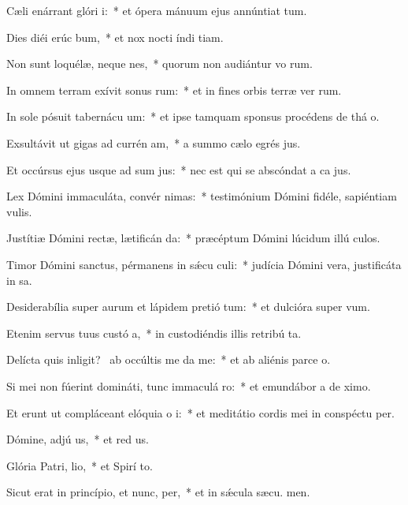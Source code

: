 \item Cæli enárrant glóri i:~* et ópera mánuum ejus annúntiat tum.
\item Dies diéi erúc bum,~* et nox nocti índi tiam.
\item Non sunt loquélæ, neque nes,~* quorum non audiántur vo rum.
\item In omnem terram exívit sonus rum:~* et in fines orbis terræ ver rum.
\item In sole pósuit tabernácu um:~* et ipse tamquam sponsus procédens de thá o.
\item Exsultávit ut gigas ad currén am,~* a summo cælo egrés jus.
\item Et occúrsus ejus usque ad sum jus:~* nec est qui se abscóndat a ca jus.
\item Lex Dómini immaculáta, convér nimas:~* testimónium Dómini fidéle, sapiéntiam  vulis.
\item Justítiæ Dómini rectæ, lætificán da:~* præcéptum Dómini lúcidum illú culos.
\item Timor Dómini sanctus, pérmanens in sǽcu culi:~* judícia Dómini vera, justificáta in sa.
\item Desiderabília super aurum et lápidem pretió tum:~* et dulcióra super   vum.
\item Etenim servus tuus custó a,~* in custodiéndis illis retribú ta.
\item Delícta quis inligit?~\pscross{} ab occúltis me da me:~* et ab aliénis parce  o.
\item Si mei non fúerint domináti, tunc immaculá ro:~* et emundábor a de ximo.
\item Et erunt ut compláceant elóquia o i:~* et meditátio cordis mei in conspéctu  per.
\item Dómine, adjú us,~* et red us.
\item Glória Patri,  lio,~* et Spirí to.
\item Sicut erat in princípio, et nunc,  per,~* et in sǽcula sæcu. men.
